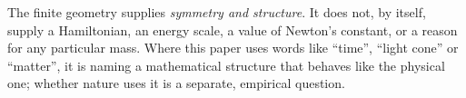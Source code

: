 \begin{boundary}
The finite geometry supplies \emph{symmetry and structure}. It does not, by itself,
supply a Hamiltonian, an energy scale, a value of Newton's constant, or a reason for any
particular mass. Where this paper uses words like ``time'', ``light cone'' or ``matter'',
it is naming a mathematical structure that behaves like the physical one; whether nature
uses it is a separate, empirical question.
\end{boundary}
